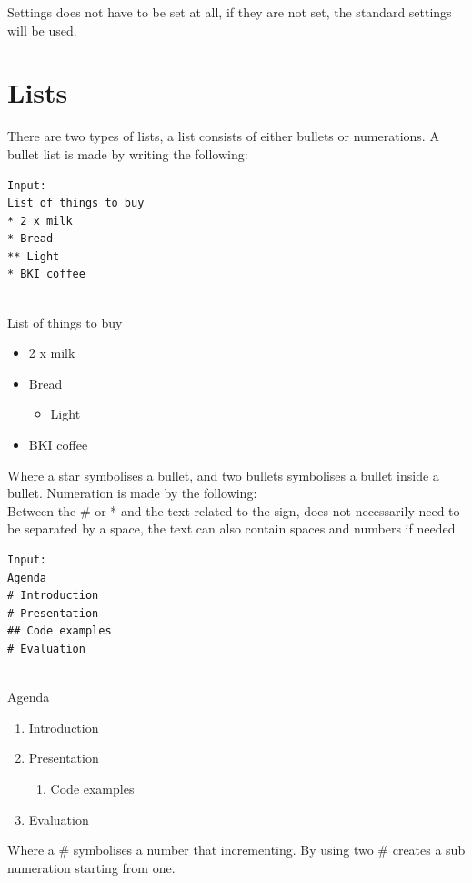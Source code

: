 Settings does not have to be set at all, if they are not set, the standard settings will be used.

\section{Lists}
There are two types of lists, a list consists of either bullets or numerations.
A bullet list is made by writing the following:\\

\begin{lstlisting}[frame=single]
Input:
List of things to buy
* 2 x milk
* Bread
** Light
* BKI coffee
\end{lstlisting}
 
 \\
List of things to buy
\begin{itemize}
\item 2 x milk
\item Bread
\begin{itemize}
\item Light
\end{itemize}
\item BKI coffee
\end{itemize}

Where a star symbolises a bullet, and two bullets symbolises a bullet inside a bullet.
Numeration is made by the following: \\
Between the \# or * and the text related to the sign, does not necessarily need to be separated by a space, the text can also contain spaces and numbers if needed.\\

\begin{lstlisting}[frame=single]
Input:
Agenda
# Introduction
# Presentation
## Code examples
# Evaluation
\end{lstlisting}

 \\
Agenda
\begin{enumerate}
\item Introduction
\item Presentation
\begin{enumerate}
\item Code examples
\end{enumerate}
\item Evaluation
\end{enumerate}

Where a \# symbolises a number that incrementing. By using two \# creates a sub numeration starting from one.

